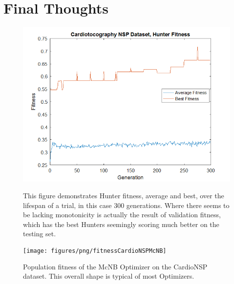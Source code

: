 \section{Final Thoughts}
\begin{figure}
	\centering
	\includegraphics[width=0.7\linewidth]{figures/png/fitnessCardioNSPHunter}
	\caption[Hunter Population Growth, CardioNSP]{This figure demonstrates Hunter fitness, average and best, over the lifespan of a trial, in this case 300 generations. Where there seems to be lacking monotonicity is actually the result of validation fitness, which has the best Hunters seemingly scoring much better on the testing set.}
	\label{fig:fitnesscardionsphunter}
	
	\texttt{[image: figures/png/fitnessCardioNSPMcNB]}
	\caption[Multiclass Na\"ive Bayes Optimizer Growth, CardioNSP]{
	Population fitness of the McNB Optimizer on the CardioNSP dataset.  This overall shape is typical of most Optimizers.}
	
\end{figure}


